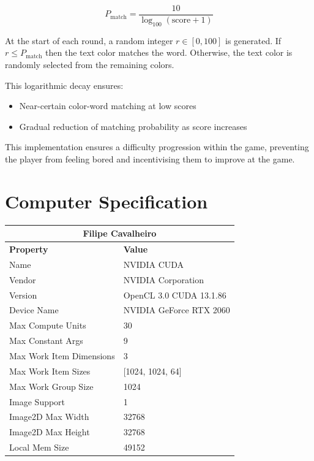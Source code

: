 \documentclass[12pt]{article}
\begin{document}
\begin{equation}
    P_{\text{match}} = \frac{10}{\log_{100}(\text{score} + 1)}
\end{equation}

At the start of each round, a random integer \( r \in [0, 100] \) is generated.
If \(r \leq P_{\text{match}}\) then the text color matches the word. Otherwise,
the text color is randomly selected from the remaining colors.

This logarithmic decay ensures:
\begin{itemize}
    \item Near-certain color-word matching at low scores
    \item Gradual reduction of matching probability as score increases
\end{itemize}

This implementation ensures a difficulty progression within the game,
preventing the player from feeling bored and incentivising them to improve at
the game.



\appendix
\section{Computer Specification} \label{anex:Computer Specification}

\begin{table}[H]
    \centering
    \centering
    \begin{tabular}{|l|l|}
        \hline
        \multicolumn{2}{|c|}{\textbf{Filipe Cavalheiro}}   \\ \hline
        \textbf{Property}        & \textbf{Value}          \\ \hline
        Name                     & NVIDIA CUDA             \\ \hline
        Vendor                   & NVIDIA Corporation      \\ \hline
        Version                  & OpenCL 3.0 CUDA 13.1.86 \\ \hline
        Device Name              & NVIDIA GeForce RTX 2060 \\ \hline
        Max Compute Units        & 30                      \\ \hline
        Max Constant Args        & 9                       \\ \hline
        Max Work Item Dimensions & 3                       \\ \hline
        Max Work Item Sizes      & [1024, 1024, 64]        \\ \hline
        Max Work Group Size      & 1024                    \\ \hline
        Image Support            & 1                       \\ \hline
        Image2D Max Width        & 32768                   \\ \hline
        Image2D Max Height       & 32768                   \\ \hline
        Local Mem Size           & 49152                   \\ \hline
    \end{tabular}
\end{table}
\end{document}
